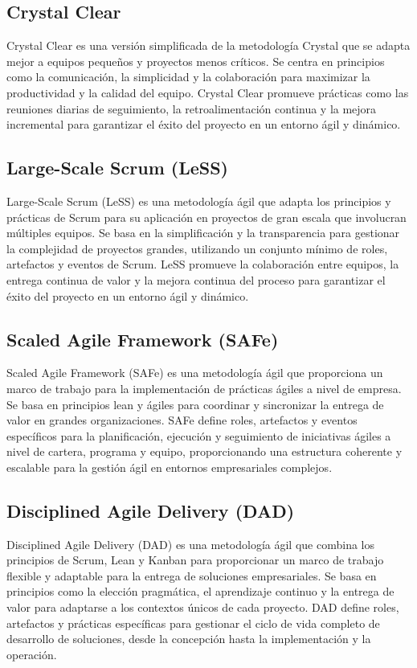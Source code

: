 \subsection{Crystal Clear}
	Crystal Clear es una versión simplificada de la metodología Crystal que se adapta mejor a equipos pequeños y proyectos menos críticos. Se centra en principios como la comunicación, la simplicidad y la colaboración para maximizar la productividad y la calidad del equipo. Crystal Clear promueve prácticas como las reuniones diarias de seguimiento, la retroalimentación continua y la mejora incremental para garantizar el éxito del proyecto en un entorno ágil y dinámico.

\subsection{Large-Scale Scrum (LeSS)}
	Large-Scale Scrum (LeSS) es una metodología ágil que adapta los principios y prácticas de Scrum para su aplicación en proyectos de gran escala que involucran múltiples equipos. Se basa en la simplificación y la transparencia para gestionar la complejidad de proyectos grandes, utilizando un conjunto mínimo de roles, artefactos y eventos de Scrum. LeSS promueve la colaboración entre equipos, la entrega continua de valor y la mejora continua del proceso para garantizar el éxito del proyecto en un entorno ágil y dinámico.

\subsection{Scaled Agile Framework (SAFe)}
	Scaled Agile Framework (SAFe) es una metodología ágil que proporciona un marco de trabajo para la implementación de prácticas ágiles a nivel de empresa. Se basa en principios lean y ágiles para coordinar y sincronizar la entrega de valor en grandes organizaciones. SAFe define roles, artefactos y eventos específicos para la planificación, ejecución y seguimiento de iniciativas ágiles a nivel de cartera, programa y equipo, proporcionando una estructura coherente y escalable para la gestión ágil en entornos empresariales complejos.

\subsection{Disciplined Agile Delivery (DAD)}
	Disciplined Agile Delivery (DAD) es una metodología ágil que combina los principios de Scrum, Lean y Kanban para proporcionar un marco de trabajo flexible y adaptable para la entrega de soluciones empresariales. Se basa en principios como la elección pragmática, el aprendizaje continuo y la entrega de valor para adaptarse a los contextos únicos de cada proyecto. DAD define roles, artefactos y prácticas específicas para gestionar el ciclo de vida completo de desarrollo de soluciones, desde la concepción hasta la implementación y la operación.

